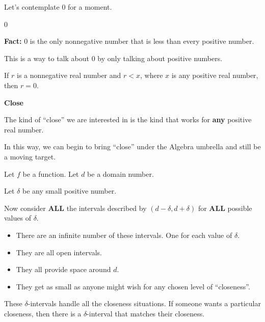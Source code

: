 \documentclass{ximera}
\begin{document}
Let's contemplate $0$ for a moment. 

\begin{fact}  \textbf{\textcolor{red!75!green!50}{$0$}} 


\textbf{Fact:} $0$ is the only nonnegative number that is less than every positive number.


\end{fact}

This is a way to talk about $0$ by only talking about positive numbers. 



If $r$ is a nonnegative real number and $r < x$, where $x$ is any positive real number, then $r = 0$.







\begin{idea} \textbf{\textcolor{blue!55!black}{Close}} 


The kind of ``close'' we are interested in is the kind that works for \textbf{\textcolor{purple!85!blue}{any}} positive real number.


\end{idea}






In this way, we can begin to bring ``close'' under the Algebra umbrella and still be a moving target.


Let $f$ be a function. Let $d$ be a domain number.

Let $\delta$ be any small positive number.

Now consider \textbf{\textcolor{red!70!black}{ALL}} the intervals described by $(d - \delta, d + \delta)$ for \textbf{\textcolor{red!70!black}{ALL}} possible values of $\delta$.


\begin{itemize}
\item There are an infinite number of these intervals. One for each value of $\delta$.
\item They are all open intervals.
\item They all provide space around $d$.
\item They get as small as anyone might wish for any chosen level of ``closeness''.
\end{itemize}

These $\delta$-intervals handle all the closeness situations.  If someone wants a particular closeness, then there is a $\delta$-interval that matches their closeness.
\end{document}
